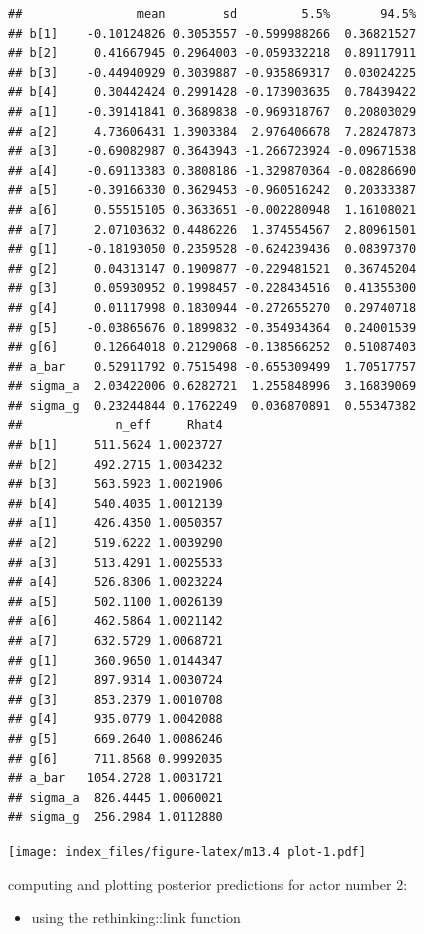 \documentclass[
]{article}
\providecommand{\tightlist}{%
  \setlength{\itemsep}{0pt}\setlength{\parskip}{0pt}}
\begin{document}
\begin{verbatim}
##                mean        sd         5.5%       94.5%
## b[1]    -0.10124826 0.3053557 -0.599988266  0.36821527
## b[2]     0.41667945 0.2964003 -0.059332218  0.89117911
## b[3]    -0.44940929 0.3039887 -0.935869317  0.03024225
## b[4]     0.30442424 0.2991428 -0.173903635  0.78439422
## a[1]    -0.39141841 0.3689838 -0.969318767  0.20803029
## a[2]     4.73606431 1.3903384  2.976406678  7.28247873
## a[3]    -0.69082987 0.3643943 -1.266723924 -0.09671538
## a[4]    -0.69113383 0.3808186 -1.329870364 -0.08286690
## a[5]    -0.39166330 0.3629453 -0.960516242  0.20333387
## a[6]     0.55515105 0.3633651 -0.002280948  1.16108021
## a[7]     2.07103632 0.4486226  1.374554567  2.80961501
## g[1]    -0.18193050 0.2359528 -0.624239436  0.08397370
## g[2]     0.04313147 0.1909877 -0.229481521  0.36745204
## g[3]     0.05930952 0.1998457 -0.228434516  0.41355300
## g[4]     0.01117998 0.1830944 -0.272655270  0.29740718
## g[5]    -0.03865676 0.1899832 -0.354934364  0.24001539
## g[6]     0.12664018 0.2129068 -0.138566252  0.51087403
## a_bar    0.52911792 0.7515498 -0.655309499  1.70517757
## sigma_a  2.03422006 0.6282721  1.255848996  3.16839069
## sigma_g  0.23244844 0.1762249  0.036870891  0.55347382
##             n_eff     Rhat4
## b[1]     511.5624 1.0023727
## b[2]     492.2715 1.0034232
## b[3]     563.5923 1.0021906
## b[4]     540.4035 1.0012139
## a[1]     426.4350 1.0050357
## a[2]     519.6222 1.0039290
## a[3]     513.4291 1.0025533
## a[4]     526.8306 1.0023224
## a[5]     502.1100 1.0026139
## a[6]     462.5864 1.0021142
## a[7]     632.5729 1.0068721
## g[1]     360.9650 1.0144347
## g[2]     897.9314 1.0030724
## g[3]     853.2379 1.0010708
## g[4]     935.0779 1.0042088
## g[5]     669.2640 1.0086246
## g[6]     711.8568 0.9992035
## a_bar   1054.2728 1.0031721
## sigma_a  826.4445 1.0060021
## sigma_g  256.2984 1.0112880
\end{verbatim}

\texttt{[image: index\_files/figure-latex/m13.4 plot-1.pdf]}

computing and plotting posterior predictions for actor number 2:

\begin{itemize}
\tightlist
\item
  using the rethinking::link function
\end{itemize}
\end{document}
